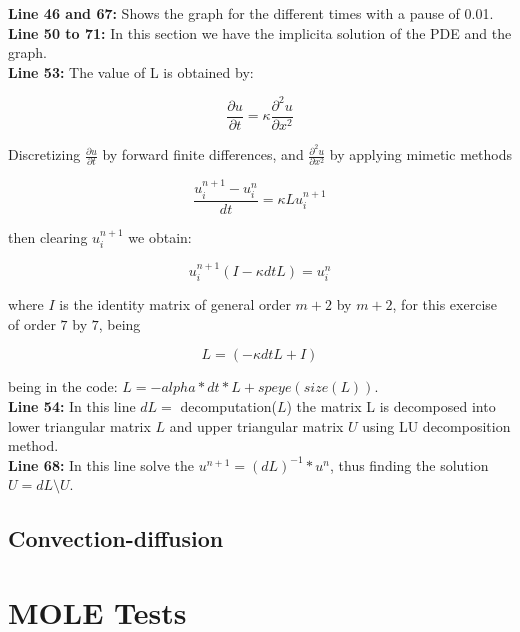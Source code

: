 \documentclass[a4paper,abstract=true]{scrreprt}
\begin{document}
\textbf{Line 46 and 67:} Shows the graph for the different times with a pause of 0.01. \\


\textbf{Line 50 to 71:} In this section we have the implicita solution of the PDE and the graph. \\

\textbf{Line 53:} The value of L is obtained by:

\begin{equation}
	\frac{\partial u}{\partial t} = \kappa \frac{\partial^{2} u}{\partial x^{2}}
\end{equation}

Discretizing $\frac{\partial u}{\partial t}$ by forward finite differences, and $\frac{\partial^{2} u}{\partial x^{2}}$ by applying mimetic methods

\begin{equation}
	\frac{u^{n+1}_{i} - u^{n}_{i} }{dt} = \kappa L 	u^{n+1}_{i}
\end{equation}

then clearing $u^{n+1}_{i}$ we obtain:


\begin{equation}
	u^{n+1}_{i}(I - \kappa dt L ) = u^{n}_{i}
\end{equation}

where $I$ is the identity matrix of general order $m+2$ by $m+2$, for this exercise of order $7$ by $7$, being

$$  L = (-\kappa dt L + I)$$

being in the code: $ L = -alpha*dt*L +speye(size(L))$.\\

\textbf{Line 54:} In this line $dL=$ decomputation($L$) the matrix L is decomposed into lower triangular matrix $L$ and upper triangular matrix $U$ using LU decomposition method.\\

\textbf{Line 68:} In this line solve the $u^{n+1} =(dL)^{-1}*u^{n}$, thus finding the solution $U=dL \setminus U$.\\



\section{Convection-diffusion}

\chapter{MOLE Tests}
\end{document}
